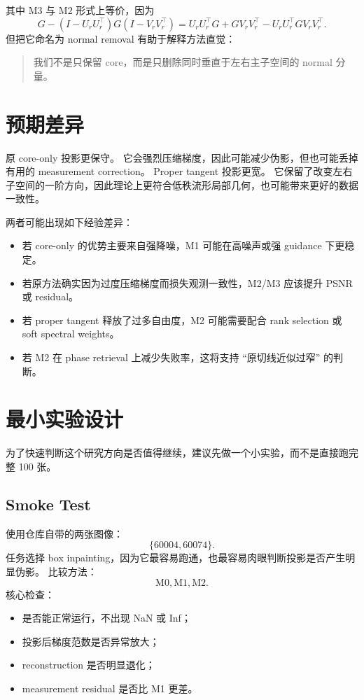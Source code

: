 \documentclass[11pt]{article}
\begin{document}
其中 M3 与 M2 形式上等价，因为
\[
    G - (I-U_rU_r^\top)G(I-V_rV_r^\top)
    =
    U_r U_r^\top G + G V_r V_r^\top - U_r U_r^\top G V_r V_r^\top .
\]
但把它命名为 normal removal 有助于解释方法直觉：
\begin{quote}
我们不是只保留 core，而是只删除同时垂直于左右主子空间的 normal 分量。
\end{quote}

\section{预期差异}

原 core-only 投影更保守。
它会强烈压缩梯度，因此可能减少伪影，但也可能丢掉有用的 measurement correction。
Proper tangent 投影更宽。
它保留了改变左右子空间的一阶方向，因此理论上更符合低秩流形局部几何，也可能带来更好的数据一致性。

两者可能出现如下经验差异：
\begin{itemize}
    \item 若 core-only 的优势主要来自强降噪，M1 可能在高噪声或强 guidance 下更稳定。
    \item 若原方法确实因为过度压缩梯度而损失观测一致性，M2/M3 应该提升 PSNR 或 residual。
    \item 若 proper tangent 释放了过多自由度，M2 可能需要配合 rank selection 或 soft spectral weights。
    \item 若 M2 在 phase retrieval 上减少失败率，这将支持 ``原切线近似过窄'' 的判断。
\end{itemize}

\section{最小实验设计}

为了快速判断这个研究方向是否值得继续，建议先做一个小实验，而不是直接跑完整 100 张。

\subsection{Smoke Test}

使用仓库自带的两张图像：
\[
    \{60004, 60074\}.
\]
任务选择 box inpainting，因为它最容易跑通，也最容易肉眼判断投影是否产生明显伪影。
比较方法：
\[
    \mathrm{M0}, \mathrm{M1}, \mathrm{M2}.
\]
核心检查：
\begin{itemize}
    \item 是否能正常运行，不出现 NaN 或 Inf；
    \item 投影后梯度范数是否异常放大；
    \item reconstruction 是否明显退化；
    \item measurement residual 是否比 M1 更差。
\end{itemize}
\end{document}
